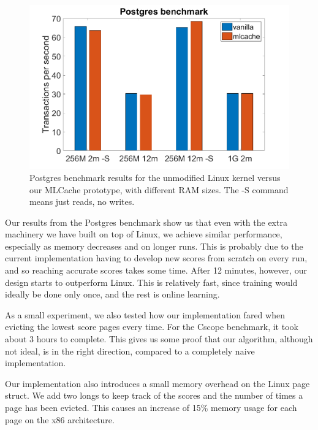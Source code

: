 \begin{figure}[h]
	\includegraphics[scale=0.3]{img/postgres_results_bigger.png}
	\caption{Postgres benchmark results for the unmodified Linux kernel versus our MLCache prototype, with different RAM sizes. The -S command means just reads, no writes.}
\end{figure}

Our results from the Postgres benchmark show us that even with the extra machinery we have built on top of Linux, we achieve similar performance, especially as memory decreases and on longer runs. This is probably due to the current implementation having to develop new scores from scratch on every run, and so reaching accurate scores takes some time. After 12 minutes, however, our design starts to outperform Linux. This is relatively fast, since training would ideally be done only once, and the rest is online learning.

As a small experiment, we also tested how our implementation fared when evicting the lowest score pages every time. For the Cscope benchmark, it took about 3 hours to complete. This gives us some proof that our algorithm, although not ideal, is in the right direction, compared to a completely naive implementation. 

Our implementation also introduces a small memory overhead on the Linux page struct. We add two longs to keep track of the scores and the number of times a page has been evicted. This causes an increase of 15\% memory usage for each page on the x86 architecture.